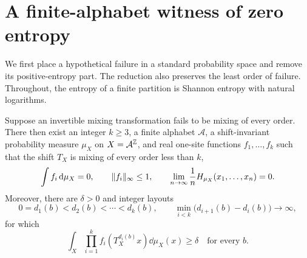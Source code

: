 \section{A finite-alphabet witness of zero entropy}\label{sec:reduction}

We first place a hypothetical failure in a standard probability space and
remove its positive-entropy part.  The reduction also preserves the least
order of failure.  Throughout, the entropy of a finite partition is Shannon
entropy with natural logarithms.

\begin{proposition}\label{prop:zero-entropy-witness}
Suppose an invertible mixing transformation fails to be mixing of every
order.  There then exist an integer $k\geq3$, a finite alphabet $\mathcal A$,
a shift-invariant probability measure $\mu_X$ on
$X=\mathcal A^{\mathbb Z}$, and real one-site functions $f_1,\ldots,f_k$ such that
the shift $T_X$ is mixing of every order less than $k$,
\[
 \int f_i\,\mathrm d\mu_X=0,\qquad \lVert f_i\rVert_{\infty}\leq1,
 \qquad
 \lim_{n\to\infty}\frac1nH_{\mu_X}(x_1,\ldots,x_n)=0.
\]
Moreover, there are $\delta>0$ and integer layouts
\[
 0=d_1(b)<d_2(b)<\cdots<d_k(b),\qquad
 \min_{i<k}\bigl(d_{i+1}(b)-d_i(b)\bigr)\longrightarrow\infty,
\]
for which
\begin{equation}\label{eq:witness-correlation}
 \int_X\prod_{i=1}^k f_i(T_X^{d_i(b)}x)\dd\mu_X(x)\geq\delta
 \quad\text{for every }b.
\end{equation}
\end{proposition}

